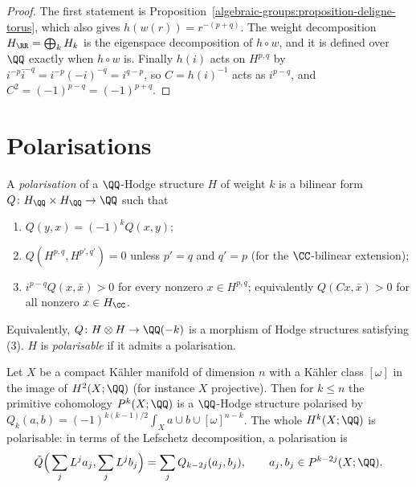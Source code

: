 \begin{proof}
The first statement is Proposition~\ref{algebraic-groups:proposition-deligne-torus}, which also gives $h(w(r)) = r^{-(p+q)}$. The weight decomposition $H_\RR = \bigoplus_kH_k$ is the eigenspace
decomposition of $h \circ w$, and it is defined over $\QQ$ exactly when $h \circ w$ is. Finally $h(i)$ acts on $H^{p,q}$ by $i^{-p}\bar i^{-q} = i^{-p}(-i)^{-q} = i^{q-p}$, so
$C = h(i)^{-1}$ acts as $i^{p-q}$, and $C^2 = (-1)^{p-q} = (-1)^{p+q}$.
\end{proof}

\section{Polarisations}\label{hodge-structures:section-polarisations}

\begin{definition}\label{hodge-structures:definition-polarisation}
A \emph{polarisation} of a $\QQ$-Hodge structure $H$ of weight $k$ is a bilinear form $Q \colon H_\QQ \times H_\QQ \to \QQ$ such that
\begin{enumerate}
\item $Q(y, x) = (-1)^kQ(x, y)$;
\item $Q(H^{p,q}, H^{p',q'}) = 0$ unless $p' = q$ and $q' = p$ (for the $\CC$-bilinear extension);
\item $i^{p-q}Q(x, \bar x) > 0$ for every nonzero $x \in H^{p,q}$; equivalently $Q(Cx, \bar x) > 0$ for all nonzero $x \in H_\CC$.
\end{enumerate}
Equivalently, $Q \colon H \otimes H \to \QQ(-k)$ is a morphism of Hodge structures satisfying (3). $H$ is \emph{polarisable} if it admits a polarisation.
\end{definition}

\begin{theorem}\label{hodge-structures:theorem-cohomology-polarised}
Let $X$ be a compact K\"ahler manifold of dimension $n$ with a K\"ahler class $[\omega]$ in the image of $H^2(X; \QQ)$ (for instance $X$ projective). Then for $k \leq n$ the primitive
cohomology $P^k(X; \QQ)$ is a $\QQ$-Hodge structure polarised by $Q_k(a, b) = (-1)^{k(k-1)/2}\int_Xa \cup b \cup [\omega]^{n-k}$. The whole $H^k(X; \QQ)$ is polarisable: in terms
of the Lefschetz decomposition, a polarisation is
\[
\tilde Q\Big(\sum_jL^ja_j, \sum_jL^jb_j\Big) = \sum_jQ_{k-2j}(a_j, b_j), \qquad a_j, b_j \in P^{k-2j}(X; \QQ).
\]
\end{theorem}

